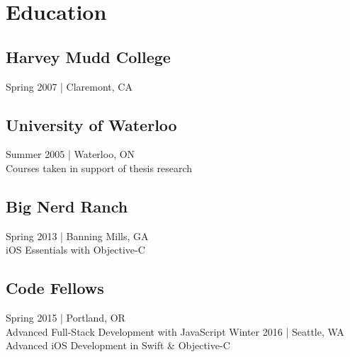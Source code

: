 \documentclass[]{jhearn-resume}
\begin{document}
\begin{minipage}[t]{0.34\textwidth}
\section{Education} 

\subsection{Harvey Mudd College}
{\footnotesize Spring 2007 | Claremont, CA}
\sectionsep

\subsection{University of Waterloo}
{\small Summer 2005 | Waterloo, ON}\\
{\footnotesize Courses taken in support of thesis research}
\sectionsep

\subsection{Big Nerd Ranch}
{\small Spring 2013 | Banning Mills, GA}\\
{\footnotesize iOS Essentials with Objective-C}
\sectionsep

\subsection{Code Fellows}
{\small Spring 2015 | Portland, OR}\\
{\footnotesize Advanced Full-Stack Development with JavaScript}
%
{\small Winter 2016 | Seattle, WA}\\
{\footnotesize Advanced iOS Development in Swift \& Objective-C}
\sectionsep
\end{minipage} 
\end{document}
